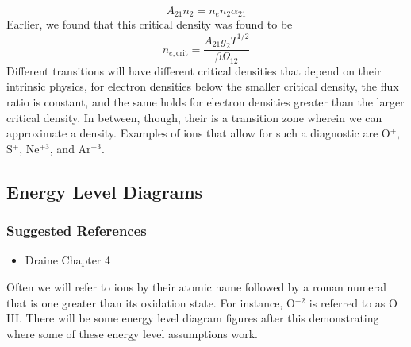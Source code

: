 \documentclass[10pt]{article}
\numberwithin{equation}{section}
\begin{document}
\begin{equation}
  \label{eq:three:22} A_{21} n_2 = n_e n_2 \alpha_{21}
\end{equation}
Earlier, we found that this critical density was found to be
\begin{equation}
  \label{eq:three:23} n_{e, \mathrm{crit}} = \frac{A_{21}g_2 T^{1/2}}{\beta \Omega_{12}}
\end{equation}
Different transitions will have different critical densities that depend on their intrinsic physics, for electron densities below the smaller critical density, the flux ratio is constant, and the same holds for electron densities greater than the larger critical density. In between, though, their is a transition zone wherein we can approximate a density. Examples of ions that allow for such a diagnostic are O$^+$, S$^+$, Ne$^{+3}$, and Ar$^{+3}$.
\subsection{Energy Level Diagrams} %
\subsubsection*{Suggested References} %
\label{ssub:suggested_references}
\begin{itemize}
  \item Draine Chapter 4
\end{itemize}
\label{sub:energy_level_diagrams}
Often we will refer to ions by their atomic name followed by a roman numeral that is one greater than its oxidation state. For instance, O$^{+2}$ is referred to as O\,III.
There will be some energy level diagram figures after this demonstrating where some of these energy level assumptions work.\\
\end{document}
